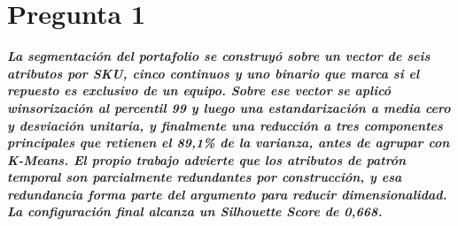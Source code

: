 \documentclass[10pt,a4paper]{article}
\begin{document}
\section*{Pregunta 1}
\label{sec:pregunta}
\textit{\textbf{La segmentación del portafolio se construyó sobre un vector de seis atributos por SKU, cinco continuos y uno binario que marca si el repuesto es exclusivo de un equipo. Sobre ese vector se aplicó winsorización al percentil 99 y luego una estandarización a media cero y desviación unitaria, y finalmente una reducción a tres componentes principales que retienen el 89,1\% de la varianza, antes de agrupar con K-Means. El propio trabajo advierte que los atributos de patrón temporal son parcialmente redundantes por construcción, y esa redundancia forma parte del argumento para reducir dimensionalidad. La configuración final alcanza un Silhouette Score de 0,668.}}
\end{document}
